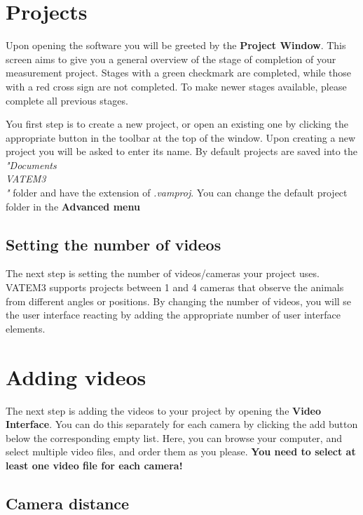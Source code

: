 \documentclass[10pt,a4paper,oneside]{report}             %
\begin{document}
\section{Projects}

Upon opening the software you will be greeted by the \textbf{Project Window}. This screen aims to give you a general overview of the stage of completion of your measurement project. Stages with a green checkmark are completed, while those with a red cross sign are not completed. To make newer stages available, please complete all previous stages.

You first step is to create a new project, or open an existing one by clicking the appropriate button in the toolbar at the top of the window. Upon creating a new project you will be asked to enter its name. By default projects are saved into the \textit{"Documents\\VATEM3\\<Project Name>"} folder and have the extension of \textit{.vamproj}. You can change the default project folder in the \textbf{Advanced menu}

\subsection{Setting the number of videos}

The next step is setting the number of videos/cameras your project uses. VATEM3 supports projects between 1 and 4 cameras that observe the animals from different angles or positions. By changing the number of videos, you will se the user interface reacting by adding the appropriate number of user interface elements.

\section{Adding videos}

The next step is adding the videos to your project by opening the \textbf{Video Interface}. You can do this separately for each camera by clicking the add button below the corresponding empty list. Here, you can browse your computer, and select multiple video files, and order them as you please. \textbf{You need to select at least one video file for each camera!}

\subsection{Camera distance}
\end{document}
